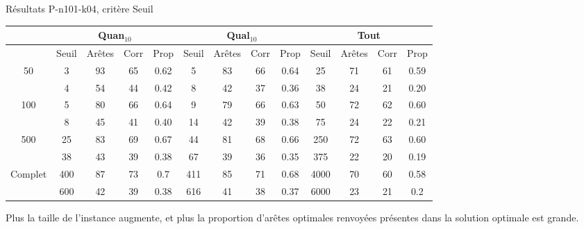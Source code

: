 \documentclass{beamer}
\begin{document}
\begin{frame}{Résultats P-n101-k04, critère Seuil}

\begin{table}[H]

\begin{tabular}{|@{}c@{}|@{}c@{}|@{}c@{}|@{}c@{}|@{}c@{}||@{}c@{}|@{}c@{}|@{}c@{}|@{}c@{}||@{}c@{}|@{}c@{}|@{}c@{}|@{}c@{}|}

\hline
 & \multicolumn{4}{c|}{Quan$_{10}$} & \multicolumn{4}{c|}{Qual$_{10}$} & \multicolumn{4}{c|}{Tout} \\
 \hline
 & Seuil & Arêtes & Corr & Prop & Seuil & Arêtes & Corr & Prop & Seuil & Arêtes & Corr & Prop \\
 \hline
 50 & 3 & 93 & 65 & 0.62 & 5 & 83 & 66 & 0.64 & 25 & 71 & 61 & 0.59 \\
 \cline{2-13} 
    & 4 & 54 & 44 & 0.42 & 8 & 42 & 37 & 0.36 & 38 & 24 & 21 & 0.20  \\
  \hline
   100 & 5 & 80 & 66 & 0.64 & 9 & 79 & 66 & 0.63 & 50 & 72 & 62 & 0.60 \\
 \cline{2-13} 
    & 8 & 45 & 41 & 0.40 & 14 & 42 & 39 & 0.38 & 75 & 24 & 22 & 0.21 \\
  \hline
   500 & 25 & 83 & 69 & 0.67 & 44 & 81 & 68 & 0.66 & 250 & 72 & 63 & 0.60 \\
 \cline{2-13} 
    & 38 & 43 & 39 & 0.38 & 67 & 39 & 36 & 0.35 & 375 & 22 & 20 & 0.19 \\
  \hline
   Complet & 400 & 87 & 73 & 0.7 & 411 & 85 & 71 & 0.68 & 4000 & 70 & 60 & 0.58 \\
 \cline{2-13} 
    & 600 & 42 & 39 & 0.38 & 616 & 41 & 38 & 0.37 & 6000 & 23 & 21 & 0.2 \\
  \hline

\end{tabular}


\end{table}

Plus la taille de l'instance augmente, et plus la proportion d'arêtes optimales  renvoyées présentes dans la solution optimale est grande.

\end{frame}
\end{document}

